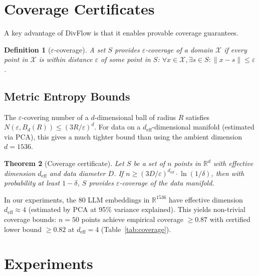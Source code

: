 \documentclass[10pt]{article}
\newtheorem{theorem}{Theorem}
\newtheorem{definition}[theorem]{Definition}
\begin{document}
\section{Coverage Certificates}
\label{sec:coverage}

A key advantage of DivFlow is that it enables provable coverage guarantees.

\begin{definition}[$\varepsilon$-coverage]
A set $S$ provides $\varepsilon$-coverage of a domain $\mathcal{X}$ if every point in $\mathcal{X}$ is within distance $\varepsilon$ of some point in $S$: $\forall x \in \mathcal{X}, \exists s \in S: \|x - s\| \leq \varepsilon$.
\end{definition}

\subsection{Metric Entropy Bounds}

The $\varepsilon$-covering number of a $d$-dimensional ball of radius $R$ satisfies $N(\varepsilon, B_d(R)) \leq (3R/\varepsilon)^d$.
For data on a $d_{\text{eff}}$-dimensional manifold (estimated via PCA), this gives a much tighter bound than using the ambient dimension $d = 1536$.

\begin{theorem}[Coverage certificate]
\label{thm:coverage}
Let $S$ be a set of $n$ points in $\mathbb{R}^d$ with effective dimension $d_{\text{eff}}$ and data diameter $D$.
If $n \geq (3D/\varepsilon)^{d_{\text{eff}}} \cdot \ln(1/\delta)$, then with probability at least $1-\delta$, $S$ provides $\varepsilon$-coverage of the data manifold.
\end{theorem}

In our experiments, the 80 LLM embeddings in $\mathbb{R}^{1536}$ have effective dimension $d_{\text{eff}} \approx 4$ (estimated by PCA at 95\% variance explained).
This yields non-trivial coverage bounds: $n=50$ points achieve empirical coverage $\geq 0.87$ with certified lower bound $\geq 0.82$ at $d_{\text{eff}} = 4$ (Table~\ref{tab:coverage}).

\section{Experiments}
\label{sec:experiments}
\end{document}
